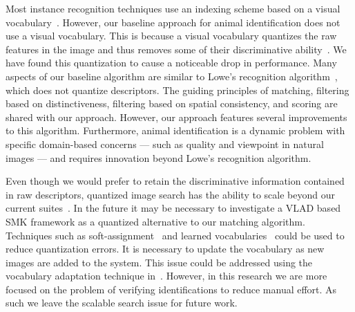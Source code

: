         Most instance recognition techniques use an indexing scheme based on a visual
        vocabulary~\cite{tolias_image_2015, jegou_hamming_2008, philbin_object_2007, cao_learning_2012,
        arandjelovic_all_2013, jegou_negative_2012, chum_fast_2012, gong_multi_scale_2014}. However, our baseline
        approach for animal identification does not use a visual vocabulary. This is because a visual vocabulary
        quantizes the raw features in the image and thus removes some of their discriminative
        ability~\cite{philbin_lost_2008, boiman_defense_2008}. We have found this quantization to cause a
        noticeable drop in performance. Many aspects of our baseline algorithm are similar to Lowe's recognition
        algorithm~\cite{lowe_distinctive_2004}, which does not quantize descriptors. The guiding principles of
        matching, filtering based on distinctiveness, filtering based on spatial consistency, and scoring are
        shared with our approach. However, our approach features several improvements to this algorithm.
        Furthermore, animal identification is a dynamic problem with specific domain-based concerns --- such as
        quality and viewpoint in natural images --- and requires innovation beyond Lowe's recognition algorithm.

        Even though we would prefer to retain the discriminative information contained in raw descriptors,
        quantized image search has the ability to scale beyond our current suites~\cite{chum_fast_2012,
        perronnin_large_scale_2010_1, tolias_image_2015}.
        In the future it may be necessary to investigate a VLAD based SMK framework as a quantized alternative to
        our matching algorithm. Techniques such as soft-assignment~\cite{philbin_lost_2008} and learned
        vocabularies~\cite{mikulik_learning_2010} could be used to reduce quantization errors. It is necessary to
        update the vocabulary as new images are added to the system. This issue could be addressed using the
        vocabulary adaptation technique in~\cite{arandjelovic_all_2013}. However, in this research we are more
        focused on the problem of verifying identifications to reduce manual effort. As such we leave the scalable
        search issue for future work.

